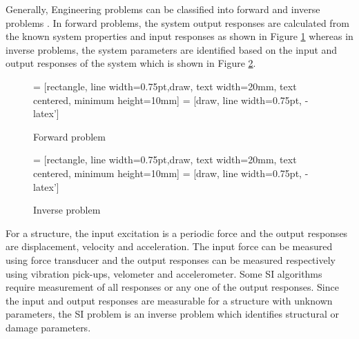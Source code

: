 \documentclass[BTech]{srmuthesis}
\begin{document}
 Generally, Engineering problems can be classified into forward and inverse problems \citep{ssikoh}. In forward problems, the system output responses are calculated from the known system properties and input responses as shown in Figure \ref{fig:fp} whereas in inverse problems, the system parameters are identified based on the input and output responses of the system which is shown in Figure \ref{fig:ip}. 
 \begin{figure}[htpb]
  \centering
     = [rectangle, line width=0.75pt,draw,  text width=20mm, text centered,  minimum height=10mm]
     = [draw, line width=0.75pt, -latex']
 \caption{Forward problem}
 \label{fig:fp}
 \end{figure}
 \begin{figure}[htpb]
   \centering
      = [rectangle, line width=0.75pt,draw,  text width=20mm, text centered,  minimum height=10mm]
      = [draw, line width=0.75pt, -latex']
  \caption{Inverse problem}
  \label{fig:ip}
  \end{figure}
  For a structure, the input excitation is a periodic force and the output responses are displacement, velocity and acceleration. The input force can be measured using force transducer and the output responses can be measured respectively using vibration pick-ups, velometer and accelerometer. Some \ac{SI} algorithms require measurement of all responses or any one of the output responses. Since the input and output responses are measurable for a structure with unknown parameters, the \ac{SI} problem is an inverse problem which identifies structural or damage parameters.\\ \vspace{-5mm}
\end{document}
